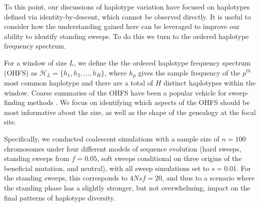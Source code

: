 \documentclass[a4paper,10pt]{article}
\begin{document}
To this point, our discussions of haplotype variation have focused on haplotypes defined via identity-by-descent, which cannot be observed directly. It is useful to consider how the understanding gained here can be leveraged to improve our ability to identify standing sweeps. To do this we turn to the ordered haplotype frequency spectrum.




For a window of size $L$, we define the the ordered haplotype frequency spectrum (OHFS) as $\mathcal{H}_L = \{h_1,h_2,\dots,h_{H}\}$, where $h_p$ gives the sample frequency of the $p^{th}$ most common haplotype and there are a total of $H$ distinct haplotypes within the window. Coarse summaries of the OHFS have been a popular vehicle for sweep-finding methods \cite[e.g. EHH, iHS and H12:][]{Sabeti:2002ge,Voight:2006go,Garud:2015jy}. We focus on identifying which aspects of the OHFS should be most informative about the size, as well as the shape of the genealogy at the focal site.

Specifically, we conducted coalescent simulations with a sample size of $n=100$ chromosomes under four different models of sequence evolution (hard sweeps, standing sweeps from $f=0.05$, soft sweeps conditional on three origins of the beneficial mutation, and neutral), with all sweep simulations set to $s=0.01$. For the standing sweeps, this corresponds to $4Nsf = 20$, and thus to a scenario where the standing phase has a slightly stronger, but not overwhelming, impact on the final patterns of haplotype diversity.
\end{document}
